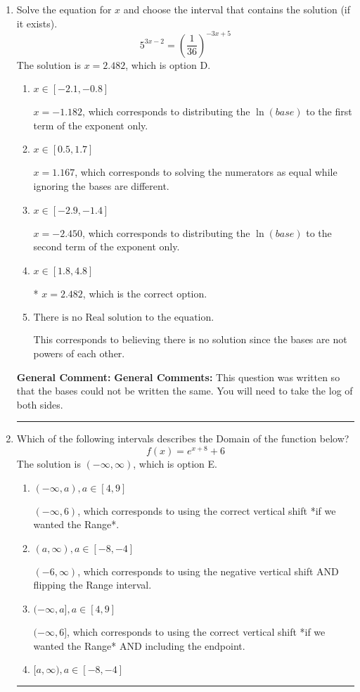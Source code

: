\documentclass{extbook}[14pt]
\newcommand{\litem}[1]{\item #1

\rule{\textwidth}{0.4pt}}
\begin{document}
\begin{enumerate}\litem{
Solve the equation for $x$ and choose the interval that contains the solution (if it exists).
\[ 5^{3x-2} = \left(\frac{1}{36}\right)^{-3x+5} \]The solution is \( x = 2.482 \), which is option D.\begin{enumerate}[label=\Alph*.]
\item \( x \in [-2.1, -0.8] \)

$x = -1.182$, which corresponds to distributing the $\ln(base)$ to the first term of the exponent only.
\item \( x \in [0.5, 1.7] \)

$x = 1.167$, which corresponds to solving the numerators as equal while ignoring the bases are different.
\item \( x \in [-2.9, -1.4] \)

$x = -2.450$, which corresponds to distributing the $\ln(base)$ to the second term of the exponent only.
\item \( x \in [1.8, 4.8] \)

* $x = 2.482$, which is the correct option.
\item \( \text{There is no Real solution to the equation.} \)

This corresponds to believing there is no solution since the bases are not powers of each other.
\end{enumerate}

\textbf{General Comment:} \textbf{General Comments:} This question was written so that the bases could not be written the same. You will need to take the log of both sides.
}
\litem{
Which of the following intervals describes the Domain of the function below?
\[ f(x) = e^{x+8}+6 \]The solution is \( (-\infty, \infty) \), which is option E.\begin{enumerate}[label=\Alph*.]
\item \( (-\infty, a), a \in [4, 9] \)

$(-\infty, 6)$, which corresponds to using the correct vertical shift *if we wanted the Range*.
\item \( (a, \infty), a \in [-8, -4] \)

$(-6, \infty)$, which corresponds to using the negative vertical shift AND flipping the Range interval.
\item \( (-\infty, a], a \in [4, 9] \)

$(-\infty, 6]$, which corresponds to using the correct vertical shift *if we wanted the Range* AND including the endpoint.
\item \( [a, \infty), a \in [-8, -4] \)


\end{enumerate}}
\end{enumerate}
\end{document}

